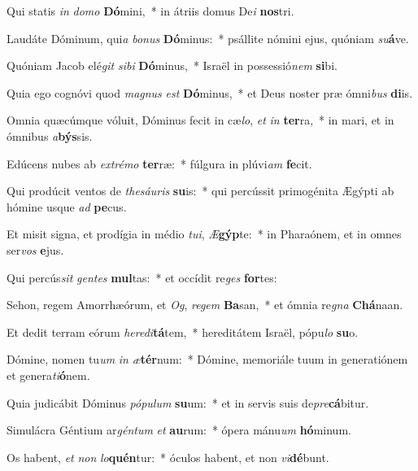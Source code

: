 \item Qui statis \textit{in} \textit{do}\textit{mo} \textbf{Dó}mini,~* in átriis domus De\textit{i} \textbf{nos}tri.
\item Laudáte Dóminum, qui\textit{a} \textit{bo}\textit{nus} \textbf{Dó}minus:~* psállite nómini ejus, quóniam \textit{su}\textbf{á}ve.
\item Quóniam Jacob elé\textit{git} \textit{si}\textit{bi} \textbf{Dó}minus,~* Israël in possessió\textit{nem} \textbf{si}bi.
\item Quia ego cognóvi quod \textit{ma}\textit{gnus} \textit{est} \textbf{Dó}minus,~* et Deus noster præ ómni\textit{bus} \textbf{di}is.
\item Omnia quæcúmque vóluit, Dóminus fecit in cæ\textit{lo}, \textit{et} \textit{in} \textbf{ter}ra,~* in mari, et in ómnibus \textit{a}\textbf{býs}sis.
\item Edúcens nubes ab \textit{ex}\textit{tré}\textit{mo} \textbf{ter}ræ:~* fúlgura in plúvi\textit{am} \textbf{fe}cit.
\item Qui prodúcit ventos de \textit{the}\textit{sáu}\textit{ris} \textbf{su}is:~* qui percússit primogénita Ægýpti ab hómine usque \textit{ad} \textbf{pe}cus.
\item Et misit signa, et prodígia in médio \textit{tu}\textit{i}, \textit{Æ}\textbf{gýp}te:~* in Pharaónem, et in omnes ser\textit{vos} \textbf{e}jus.
\item Qui percús\textit{sit} \textit{gen}\textit{tes} \textbf{mul}tas:~* et occídit re\textit{ges} \textbf{for}tes:
\item Sehon, regem Amorrhæórum, et \textit{Og}, \textit{re}\textit{gem} \textbf{Ba}san,~* et ómnia re\textit{gna} \textbf{Chá}naan.
\item Et dedit terram eórum \textit{he}\textit{re}\textit{di}\textbf{tá}tem,~* hereditátem Israël, pópu\textit{lo} \textbf{su}o.
\item Dómine, nomen tu\textit{um} \textit{in} \textit{æ}\textbf{tér}num:~* Dómine, memoriále tuum in generatiónem et genera\textit{ti}\textbf{ó}nem.
\item Quia judicábit Dóminus \textit{pó}\textit{pu}\textit{lum} \textbf{su}um:~* et in servis suis de\textit{pre}\textbf{cá}bitur.
\item Simulácra Géntium ar\textit{gén}\textit{tum} \textit{et} \textbf{au}rum:~* ópera mánu\textit{um} \textbf{hó}minum.
\item Os habent, \textit{et} \textit{non} \textit{lo}\textbf{quén}tur:~* óculos habent, et non \textit{vi}\textbf{dé}bunt.

